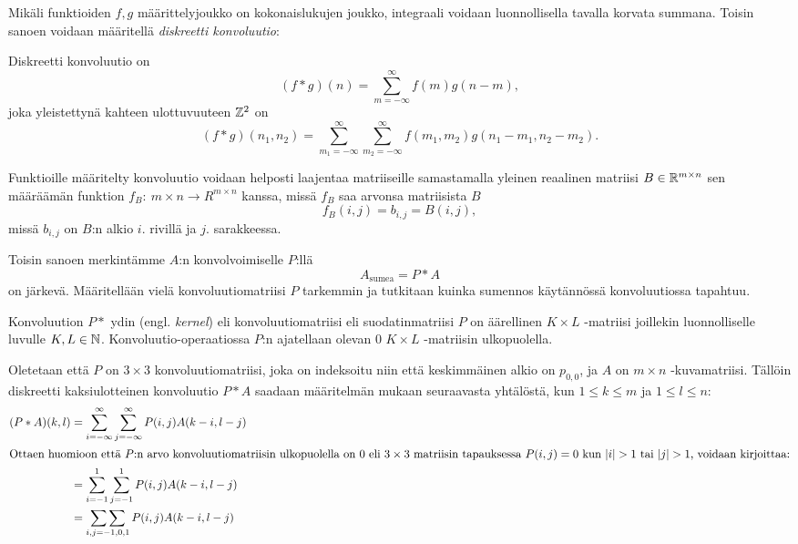 Mikäli funktioiden $f, g$ määrittelyjoukko on kokonaislukujen joukko, integraali voidaan luonnollisella tavalla korvata summana.
Toisin sanoen voidaan määritellä \emph{diskreetti konvoluutio}:

\begin{maar}
    Diskreetti konvoluutio on
    \[
        (f \ast g) (n) = \sum^{\infty}_{m=-\infty} f(m) g(n - m),
    \]
    joka yleistettynä kahteen ulottuvuuteen $\mathbb{Z}^2$ on
    \[
        (f \ast g)(n_1, n_2) =
        \sum^{\infty}_{m_1=-\infty} \sum^{\infty}_{m_2=-\infty}
        f(m_1, m_2) g(n_1-m_1, n_2-m_2).
    \]
\end{maar}

Funktioille määritelty konvoluutio voidaan helposti laajentaa matriiseille samastamalla yleinen reaalinen matriisi $B \in \mathbb{R}^{m \times n}$ sen määräämän funktion $f_B:~m \times n \to R^{m \times n}$ kanssa, missä $f_B$ saa arvonsa matriisista $B$
\begin{equation}
    f_B(i, j) = b_{i,j} = B(i,j),
\end{equation}
missä $b_{i,j}$ on $B$:n alkio $i.$ rivillä ja $j.$ sarakkeessa.

Toisin sanoen merkintämme $A$:n konvolvoimiselle $P$:llä
\begin{equation}
    A_\text{sumea} = P \ast A
\end{equation}
on järkevä.
Määritellään vielä konvoluutiomatriisi $P$ tarkemmin ja tutkitaan kuinka sumennos käytännössä konvoluutiossa tapahtuu.

\begin{maar}
    Konvoluution $P \ast$ ydin (engl. \emph{kernel}) eli konvoluutiomatriisi eli suodatinmatriisi $P$ on äärellinen $K \times L$ -matriisi joillekin luonnolliselle luvulle $K, L \in \mathbb{N}$.
    Konvoluutio-operaatiossa $P$:n ajatellaan olevan 0 $K \times L$ -matriisin ulkopuolella.
\end{maar}

Oletetaan että $P$ on $3 \times 3$ konvoluutiomatriisi, joka on indeksoitu niin että keskimmäinen alkio on $p_{0,0}$, ja $A$ on $m \times n$ -kuvamatriisi.
Tällöin diskreetti kaksiulotteinen konvoluutio $P \ast A$ saadaan määritelmän mukaan seuraavasta yhtälöstä, kun $1 \leq k \leq m$ ja $1 \leq l \leq n$:
\begin{align}
    \label{eq:konvoluutiosumma}
    (P \ast A)(k,l) &= \sum^{\infty}_{i=-\infty} \sum^{\infty}_{j=-\infty} P(i, j) A(k - i, l - j) \\
    \intertext{Ottaen huomioon että $P$:n arvo konvoluutiomatriisin ulkopuolella on 0 eli $3 \times 3$ matriisin tapauksessa $P(i, j) = 0$ kun $ \lvert i\rvert > 1$ tai $\lvert j\rvert >1$, voidaan kirjoittaa:}
        &=  \sum_{i = -1}^1\sum_{j = -1}^1 P(i, j) A(k - i, l - j) \\
        &=  \mathop{\sum\sum}_{i, j = -1, 0, 1} P(i, j) A(k - i, l - j)
\end{align}

